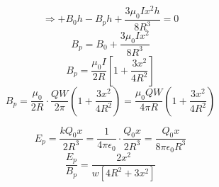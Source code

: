 \documentclass[11pt,a4paper]{scrartcl}
\begin{document}
\begin{solution}
\flushleft
$$\Rightarrow +B_0h - B_ph +\frac{3\mu_0Ix^2h}{8R^3}=0$$
$$B_p=B_0+\frac{3\mu_0Ix^2}{8R^3}$$
$$B_p=\frac{\mu_0I}{2R}[1+\frac{3x^2}{4R^2}]$$
$$B_p=\frac{\mu_0}{2R}\cdot\frac{QW}{2\pi}(1+\frac{3x^2}{4R^2})=\frac{\mu_0QW}{4\pi R}(1+\frac{3x^2}{4R^2})$$

$$E_p=\frac{kQ_0x}{2R^3}=\frac{1}{4\pi\epsilon_0}\cdot\frac{Q_0x}{2R^3}=\frac{Q_0x}{8\pi\epsilon_0R^3}$$
$$\frac{E_p}{B_p}=\frac{2x^2}{w[4R^2+3x^2]}$$ \\


\end{solution}




\end{document}

